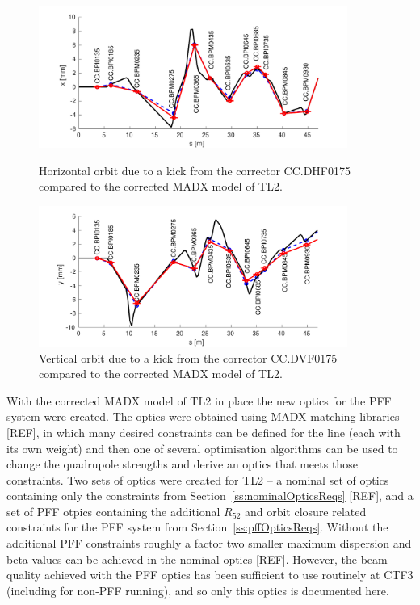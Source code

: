 \begin{figure}
  \centering
  \includegraphics[width=0.9\textwidth]{Figures/optics/modelCorrectedH}
  \caption{Horizontal orbit due to a kick from the corrector CC.DHF0175 compared to the corrected MADX model of TL2.}
  \label{f:modelCorrectedH}
  \includegraphics[width=0.9\textwidth]{Figures/optics/modelCorrectedV}
  \caption{Vertical orbit due to a kick from the corrector CC.DVF0175 compared to the corrected MADX model of TL2.}
  \label{f:modelCorrectedV}
\end{figure}


With the corrected MADX model of TL2 in place the new optics for the PFF system were created. The optics were obtained using MADX matching libraries [REF], in which many desired constraints can be defined for the line (each with its own weight) and then one of several optimisation algorithms can be used to change the quadrupole strengths and derive an optics that meets those constraints. Two sets of optics were created for TL2 -- a nominal set of optics containing only the constraints from Section~\ref{ss:nominalOpticsReqs} [REF], and a set of PFF otpics containing the additional \(R_{52}\) and orbit closure related constraints for the PFF system from Section~\ref{ss:pffOpticsReqs}. Without the additional PFF constraints roughly a factor two smaller maximum dispersion and beta values can be achieved in the nominal optics [REF]. However, the beam quality achieved with the PFF optics has been sufficient to use routinely at CTF3 (including for non-PFF running), and so only this optics is documented here.

